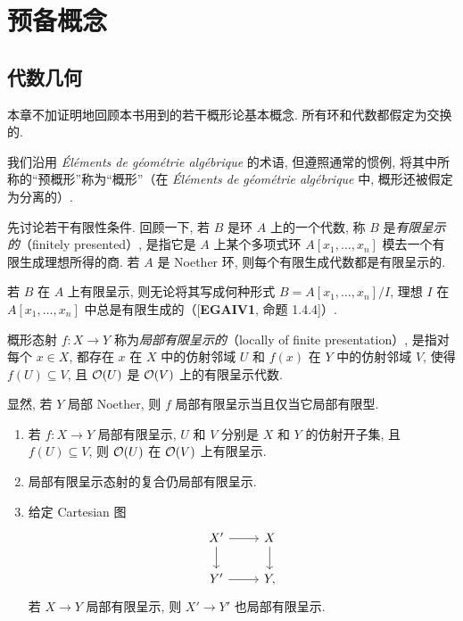 \chapter{预备概念}\label{ch01}
\section{代数几何}\label{ch01:sec1}
本章不加证明地回顾本书用到的若干概形论基本概念. 所有环和代数都假定为交换的.

我们沿用 \textit{Éléments de géométrie algébrique} 的术语, 但遵照通常的惯例, 将其中所称的“预概形”称为“概形”（在 \textit{Éléments de géométrie algébrique} 中, 概形还被假定为分离的）.

先讨论若干有限性条件. 回顾一下, 若 $B$ 是环 $A$ 上的一个代数, 称 $B$ 是\emph{有限呈示的}（finitely presented）, 是指它是 $A$ 上某个多项式环 $A[x_1,\ldots,x_n]$ 模去一个有限生成理想所得的商. 若 $A$ 是 Noether 环, 则每个有限生成代数都是有限呈示的.

若 $B$ 在 $A$ 上有限呈示, 则无论将其写成何种形式 $B=A[x_1,\ldots,x_n]/I$, 理想 $I$ 在 $A[x_1,\ldots,x_n]$ 中总是有限生成的（[\textbf{EGAIV1}, 命题 1.4.4]）.

\begin{definition}\label{ch01:def1.1}
概形态射 $f\colon X\to Y$ 称为\emph{局部有限呈示的}（locally of finite presentation）, 是指对每个 $x\in X$, 都存在 $x$ 在 $X$ 中的仿射邻域 $U$ 和 $f(x)$ 在 $Y$ 中的仿射邻域 $V$, 使得 $f(U)\subseteq V$, 且 $\mathcal O(U)$ 是 $\mathcal O(V)$ 上的有限呈示代数.
\end{definition}

显然, 若 $Y$ 局部 Noether, 则 $f$ 局部有限呈示当且仅当它局部有限型.

\begin{proposition}\label{ch01:prop1.2}
\begin{enumerate}
\item 若 $f\colon X\to Y$ 局部有限呈示, $U$ 和 $V$ 分别是 $X$ 和 $Y$ 的仿射开子集, 且 $f(U)\subseteq V$, 则 $\mathcal O(U)$ 在 $\mathcal O(V)$ 上有限呈示.
\item 局部有限呈示态射的复合仍局部有限呈示.
\item 给定 Cartesian 图
\[\begin{tikzcd}X'\ar[r]\ar[d]&X\ar[d]\\Y'\ar[r]&Y,\end{tikzcd}\]
若 $X\to Y$ 局部有限呈示, 则 $X'\to Y'$ 也局部有限呈示.
\end{enumerate}
\end{proposition}

